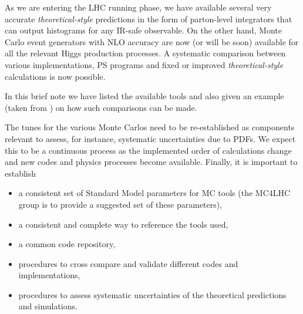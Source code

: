 As we are entering the LHC running phase, we have available several very 
accurate {\em theoretical-style} predictions in the form of parton-level integrators that 
can output histograms for any IR-safe observable.  On the other hand, 
Monte Carlo event generators with NLO accuracy are now (or will be soon)  
available for all the relevant Higgs production processes. A systematic 
comparison between various implementations, PS programs and fixed or 
improved {\em theoretical-style} calculations is now possible. 

In this brief note we have listed the available tools and also given an 
example (taken from ) on how such comparisons 
can be made.

The tunes for the various Monte Carlos need to be re-established as 
components relevant to assess, for instance, systematic uncertainties due to
PDFs.  We expect this to be a continuous process as the implemented order of 
calculations change and new codes and physics processes become available.  
Finally, it is important to establish 
\begin{itemize}
\item a consistent set of Standard Model parameters for MC tools  
      (the MC4LHC group is to provide a suggested set of these parameters),
\item a consistent and complete way to reference the tools used,
\item a common code repository,
\item procedures to cross compare and validate different codes and 
      implementations,
\item procedures to assess systematic uncertainties of the theoretical 
      predictions and simulations.  
\end{itemize}


\clearpage
